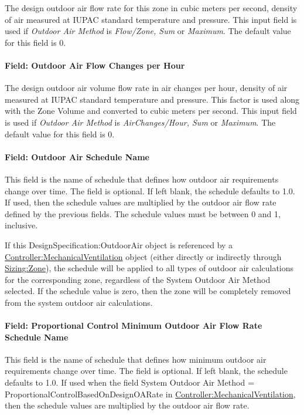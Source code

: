 The design outdoor air flow rate for this zone in cubic meters per second, density of air measured at IUPAC standard temperature and pressure. This input field is used if \emph{Outdoor Air Method} is \emph{Flow/Zone, Sum} or \emph{Maximum}. The default value for this field is 0.

\paragraph{Field: Outdoor Air Flow Changes per Hour}\label{field-outdoor-air-flow-changes-per-hour}

The design outdoor air volume flow rate in air changes per hour, density of air measured at IUPAC standard temperature and pressure. This factor is used along with the Zone Volume and converted to cubic meters per second. This input field is used if \emph{Outdoor Air Method} is \emph{AirChanges/Hour, Sum} or \emph{Maximum}. The default value for this field is 0.

\paragraph{Field: Outdoor Air Schedule Name}\label{field-outdoor-air-schedule-name}

This field is the name of schedule that defines how outdoor air requirements change over time. The field is optional. If left blank, the schedule defaults to 1.0. If used, then the schedule values are multiplied by the outdoor air flow rate defined by the previous fields. The schedule values must be between 0 and 1, inclusive.

If this DesignSpecification:OutdoorAir object is referenced by a \hyperref[controllermechanicalventilation]{Controller:MechanicalVentilation} object (either directly or indirectly through \hyperref[sizingzone]{Sizing:Zone}), the schedule will be applied to all types of outdoor air calculations for the corresponding zone, regardless of the System Outdoor Air Method selected. If the schedule value is zero, then the zone will be completely removed from the system outdoor air calculations.

\paragraph{Field: Proportional Control Minimum Outdoor Air Flow Rate Schedule Name }\label{field-proportional-control-minimum-outdoor-air-flow-rate-schedule-name}

This field is the name of schedule that defines how minimum outdoor air requirements change over time. The field is optional. If left blank, the schedule defaults to 1.0. If used when the field System Outdoor Air Method = ProportionalControlBasedOnDesignOARate in \hyperref[controllermechanicalventilation]{Controller:MechanicalVentilation}, then the schedule values are multiplied by the outdoor air flow rate.

